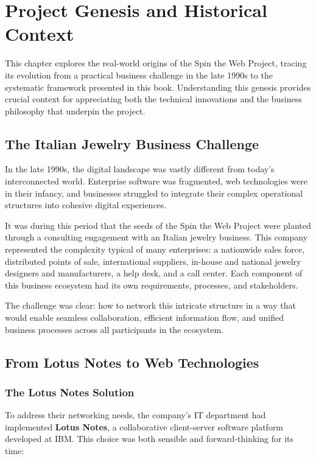 \chapter{Project Genesis and Historical Context}
\label{chap:genesis}

This chapter explores the real-world origins of the Spin the Web Project, tracing its evolution from a practical business challenge in the late 1990s to the systematic framework presented in this book. Understanding this genesis provides crucial context for appreciating both the technical innovations and the business philosophy that underpin the project.

\section{The Italian Jewelry Business Challenge}

In the late 1990s, the digital landscape was vastly different from today's interconnected world. Enterprise software was fragmented, web technologies were in their infancy, and businesses struggled to integrate their complex operational structures into cohesive digital experiences.

It was during this period that the seeds of the Spin the Web Project were planted through a consulting engagement with an Italian jewelry business. This company represented the complexity typical of many enterprises: a nationwide sales force, distributed points of sale, international suppliers, in-house and national jewelry designers and manufacturers, a help desk, and a call center. Each component of this business ecosystem had its own requirements, processes, and stakeholders.

The challenge was clear: how to network this intricate structure in a way that would enable seamless collaboration, efficient information flow, and unified business processes across all participants in the ecosystem.

\section{From Lotus Notes to Web Technologies}

\subsection{The Lotus Notes Solution}

To address their networking needs, the company's IT department had implemented \textbf{Lotus Notes}, a collaborative client-server software platform developed at IBM. This choice was both sensible and forward-thinking for its time:

